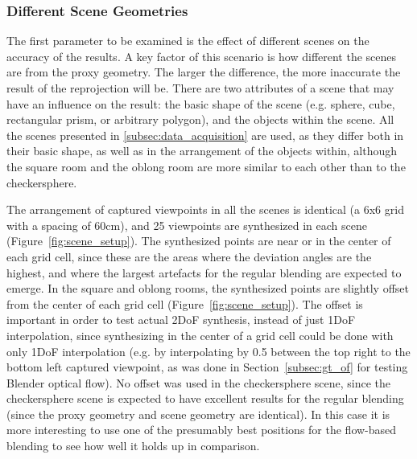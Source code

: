 \subsubsection{Different Scene Geometries}
The first parameter to be examined is the effect of different scenes on the accuracy of the results. A key factor of this scenario is how different the scenes are from the proxy geometry. The larger the difference, the more inaccurate the result of the reprojection will be. There are two attributes of a scene that may have an influence on the result: the basic shape of the scene (e.g. sphere, cube, rectangular prism, or arbitrary polygon), and the objects within the scene. All the scenes presented in \ref{subsec:data_acquisition} are used, as they differ both in their basic shape, as well as in the arrangement of the objects within, although the square room and the oblong room are more similar to each other than to the checkersphere.

The arrangement of captured viewpoints in all the scenes is identical (a 6x6 grid with a spacing of 60cm), and 25 viewpoints are synthesized in each scene (Figure~\ref{fig:scene_setup}). The synthesized points are near or in the center of each grid cell, since these are the areas where the deviation angles are the highest, and where the largest artefacts for the regular blending are expected to emerge. In the square and oblong rooms, the synthesized points are slightly offset from the center of each grid cell (Figure~\ref{fig:scene_setup}). The offset is important in order to test actual 2DoF synthesis, instead of just 1DoF interpolation, since synthesizing in the center of a grid cell could be done with only 1DoF interpolation (e.g. by interpolating by 0.5 between the top right to the bottom left captured viewpoint, as was done in Section~\ref{subsec:gt_of} for testing Blender optical flow). No offset was used in the checkersphere scene, since the checkersphere scene is expected to have excellent results for the regular blending (since the proxy geometry and scene geometry are identical). In this case it is more interesting to use one of the presumably best positions for the flow-based blending to see how well it holds up in comparison.

